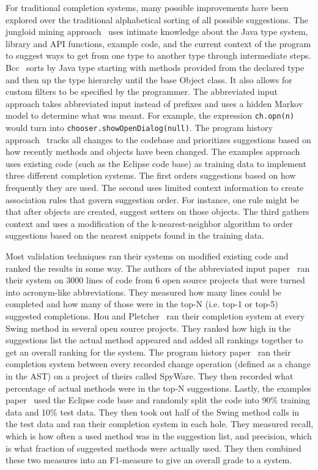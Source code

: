 \documentclass[ms,electronic,twosidetoc,letterpaper,chaptercenter,parttop,lol,lof,lot]{byumsphd}
\begin{document}
For traditional completion systems, many possible improvements have been explored over the traditional alphabetical sorting of all possible suggestions.
The jungloid mining approach~\cite{Jungloid} uses intimate knowledge about the Java type system, library and API functions, example code, and the current context of the program to suggest ways to get from one type to another type through intermediate steps.
Bcc~\cite{BCC} sorts by Java type starting with methods provided from the declared type and then up the type hierarchy until the base Object class.
It also allows for custom filters to be specified by the programmer.
The abbreviated input approach\cite{Abbreviated} takes abbreviated input instead of prefixes and uses a hidden Markov model to determine what was meant.
For example, the expression \texttt{ch.opn(n)} would turn into \texttt{chooser.showOpenDialog(null)}.
The program history approach~\cite{History} tracks all changes to the codebase and prioritizes suggestions based on how recently methods and objects have been changed.
The examples approach~\cite{Examples} uses existing code (such as the Eclipse code base) as training data to implement three different completion systems.
The first orders suggestions based on how frequently they are used.
The second uses limited context information to create association rules that govern suggestion order.
For instance, one rule might be that after objects are created, suggest setters on those objects.
The third gathers context and uses a modification of the k-nearest-neighbor algorithm to order suggestions based on the nearest snippets found in the training data.

Most validation techniques ran their systems on modified existing code and ranked the results in some way.
The authors of the abbreviated input paper~\cite{Abbreviated} ran their system on 3000 lines of code from 6 open source projects that were turned into acronym-like abbreviations.
They measured how many lines could be completed and how many of those were in the top-N (i.e. top-1 or top-5) suggested completions.
Hou and Pletcher~\cite{Towards} ran their completion system at every Swing method in several open source projects.
They ranked how high in the suggestions list the actual method appeared and added all rankings together to get an overall ranking for the system.
The program history paper~\cite{History} ran their completion system between every recorded change operation (defined as a change in the AST) on a project of theirs called SpyWare.
They then recorded what percentage of actual methods were in the top-N suggestions.
Lastly, the examples paper~\cite{Examples} used the Eclipse code base and randomly split the code into 90\% training data and 10\% test data.
They then took out half of the Swing method calls in the test data and ran their completion system in each hole.
They measured recall, which is how often a used method was in the suggestion list, and precision, which is what fraction of suggested methods were actually used.
They then combined these two measures into an F1-measure to give an overall grade to a system.
\end{document}
